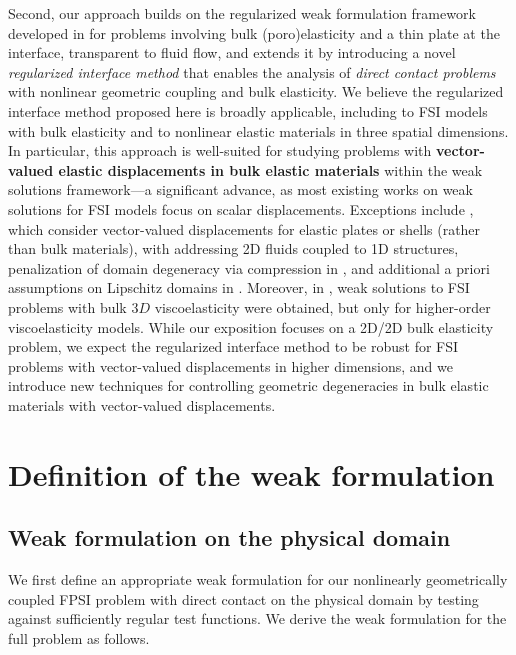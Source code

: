 \documentclass[11pt]{article}
\theoremstyle{definition}
\begin{document}
Second, our approach builds on the regularized weak formulation framework developed in \cite{NonlinearFPSI_CRM23, FPSIJMPA} for problems involving bulk (poro)elasticity and a thin plate at the interface, transparent to fluid flow, and extends it by introducing a novel \textit{regularized interface method} that enables the analysis of {\emph{direct contact problems}} with nonlinear geometric coupling and bulk elasticity. We believe the regularized interface method proposed here is broadly applicable, including to FSI models with bulk elasticity and to nonlinear elastic materials in three spatial dimensions. In particular, this approach is well-suited for studying problems with \textbf{vector-valued elastic displacements in bulk elastic materials} within the weak solutions framework—a significant advance, as most existing works on weak solutions for FSI models focus on scalar displacements. Exceptions include \cite{Tawri3D, Grandmont2D, KSS2D, BorSunSlip, FSIStent, BKS24}, which consider vector-valued displacements for elastic plates or shells (rather than bulk materials), with \cite{Grandmont2D, KSS2D, BorSunSlip} addressing 2D fluids coupled to 1D structures, penalization of domain degeneracy via compression in \cite{KSS2D}, and additional a priori assumptions on Lipschitz domains in \cite{FSIStent}. Moreover, in \cite{BKS24, BrKS24}, weak solutions to FSI problems with bulk $3D$ viscoelasticity were obtained, but only for higher-order viscoelasticity models. While our exposition focuses on a 2D/2D bulk elasticity problem, we expect the regularized interface method to be robust for FSI problems with vector-valued displacements in higher dimensions, and we introduce new techniques for controlling geometric degeneracies in bulk elastic materials with vector-valued displacements.

\section{Definition of the weak formulation}\label{weaksection}

\subsection{Weak formulation on the physical domain}\label{derivation}

We first define an appropriate weak formulation for our nonlinearly geometrically coupled FPSI problem with direct contact on the physical domain by testing against sufficiently regular test functions. We derive the weak formulation for the full problem as follows. 
\end{document}
